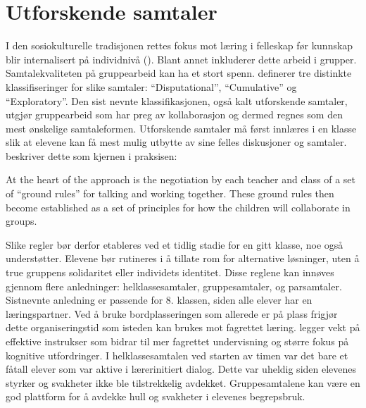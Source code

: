 \documentclass[12pt,twoside,onecolumn,norsk]{article}
\begin{document}
\section*{Utforskende samtaler}
I den sosiokulturelle tradisjonen rettes fokus mot læring i felleskap før kunnskap blir 
internalisert på individnivå (). Blant annet inkluderer dette arbeid i grupper. 
Samtalekvaliteten på gruppearbeid kan ha et stort spenn.  definerer tre 
distinkte klassifiseringer for slike samtaler: ``Disputational'', ``Cumulative'' og ``Exploratory''. 
Den sist nevnte klassifikasjonen, også kalt utforskende samtaler, utgjør gruppearbeid som har preg 
av kollaborasjon og dermed regnes som den mest ønskelige samtaleformen.
\newline
\newline
Utforskende samtaler må først innlæres i en klasse slik at elevene kan få mest mulig 
utbytte av sine felles diskusjoner og samtaler.  beskriver dette 
som kjernen i praksisen:
\begin{displayquote}
At the heart of the approach is the negotiation by each teacher and class of a set of ``ground
rules'' for talking and working together. These ground rules then become established as a set of 
principles for how the children will collaborate in groups.
\end{displayquote}
Slike regler bør derfor etableres ved et tidlig stadie for en gitt klasse, noe  
også understøtter. Elevene bør rutineres i å tillate rom for alternative løsninger, uten å true 
gruppens solidaritet eller individets identitet. Disse reglene kan innøves gjennom flere anledninger: 
helklassesamtaler, gruppesamtaler, og parsamtaler. Sistnevnte anledning er passende for 8. klassen, 
siden alle elever har en læringspartner. Ved å bruke bordplasseringen som allerede er på plass 
frigjør dette organiseringstid som isteden kan brukes mot fagrettet læring.  legger 
vekt på effektive instrukser som bidrar til mer fagrettet undervisning og større fokus på kognitive 
utfordringer.
\newline
\newline
I helklassesamtalen ved starten av timen var det bare et fåtall elever som var aktive i lærerinitiert 
dialog. Dette var uheldig siden elevenes styrker og svakheter ikke ble tilstrekkelig avdekket. 
Gruppesamtalene kan være en god plattform for å avdekke hull og svakheter i elevenes begrepsbruk.
\newline
\end{document}
